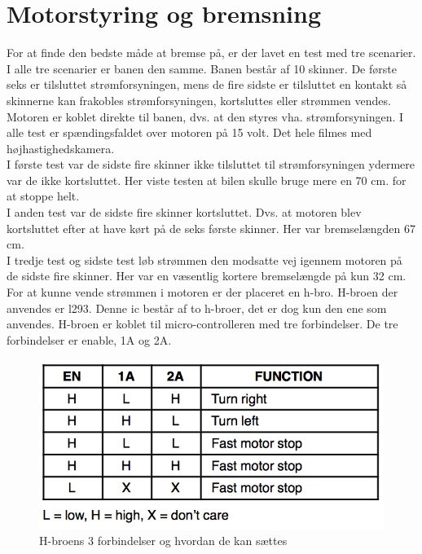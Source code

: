 \section{Motorstyring og bremsning}
For at finde den bedste måde at bremse på, er der lavet en test med tre scenarier. I alle tre scenarier er banen den samme. Banen består af 10 skinner. De første seks er tilsluttet strømforsyningen, mens de fire sidste er tilsluttet en kontakt så skinnerne kan frakobles strømforsyningen, kortsluttes eller strømmen vendes. Motoren er koblet direkte til banen, dvs. at den styres vha. strømforsyningen. I alle test er spændingsfaldet over motoren på 15 volt. Det hele filmes med højhastighedskamera. \\

I første test var de sidste fire skinner ikke tilsluttet til strømforsyningen ydermere var de ikke kortsluttet. Her viste testen at bilen skulle bruge mere en 70 cm. for at stoppe helt. \\
I anden test var de sidste fire skinner kortsluttet. Dvs. at motoren blev kortsluttet efter at have kørt på de seks første skinner. Her var bremselængden 67 cm. \\
I tredje test og sidste test løb strømmen den modsatte vej igennem motoren på de sidste fire skinner. Her var en væsentlig kortere bremselængde på kun 32 cm. \\

For at kunne vende strømmen i motoren er der placeret en h-bro. H-broen der anvendes er l293. Denne ic består af to h-broer, det er dog kun den ene som anvendes. H-broen er koblet til micro-controlleren med tre forbindelser. De tre forbindelser er enable, 1A og 2A. 

\begin{figure}[h!]
\center
\includegraphics[scale=0.35]{./Graphics/h-bro_forbindelse.png}
\caption{H-broens 3 forbindelser og hvordan de kan sættes}
\label{hbro_forbindelse}
\end{figure}

